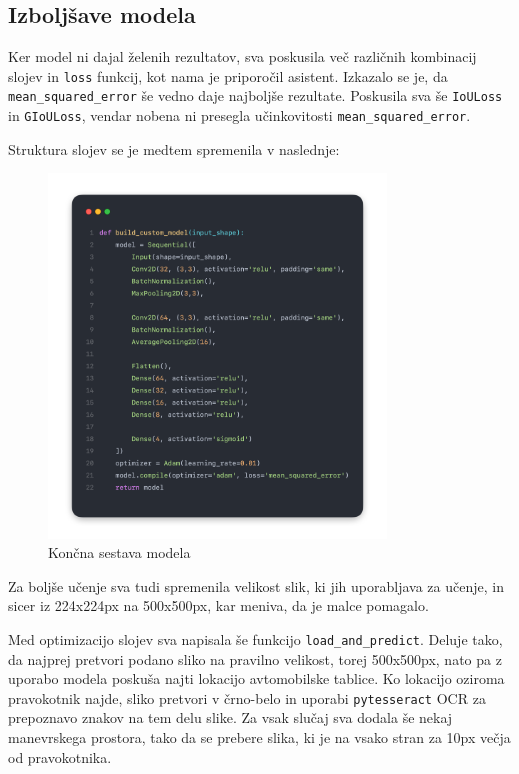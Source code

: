 \documentclass[a4paper,12pt]{article}
\begin{document}
\subsection*{Izboljšave modela}
Ker model ni dajal želenih rezultatov, sva poskusila več različnih kombinacij slojev in \texttt{loss} funkcij, kot nama je priporočil asistent. Izkazalo se je, da \texttt{mean\_squared\_error} še vedno daje najboljše rezultate. Poskusila sva še \texttt{IoULoss} in \texttt{GIoULoss}, vendar nobena ni presegla učinkovitosti \texttt{mean\_squared\_error}.

Struktura slojev se je medtem spremenila v naslednje:

\begin{figure}[H]
    \centering
    \includegraphics[width=0.8\textwidth]{img/build_custom_model2.png}
    \caption{Končna sestava modela}
\end{figure}

Za boljše učenje sva tudi spremenila velikost slik, ki jih uporabljava za učenje, in sicer iz 224x224px na 500x500px, kar meniva, da je malce pomagalo.

Med optimizacijo slojev sva napisala še funkcijo \texttt{load\_and\_predict}. Deluje tako, da najprej pretvori podano sliko na pravilno velikost, torej 500x500px, nato pa z uporabo modela poskuša najti lokacijo avtomobilske tablice. Ko lokacijo oziroma pravokotnik najde, sliko pretvori v črno-belo in uporabi \texttt{pytesseract} OCR za prepoznavo znakov na tem delu slike. Za vsak slučaj sva dodala še nekaj manevrskega prostora, tako da se prebere slika, ki je na vsako stran za 10px večja od pravokotnika.
\end{document}
